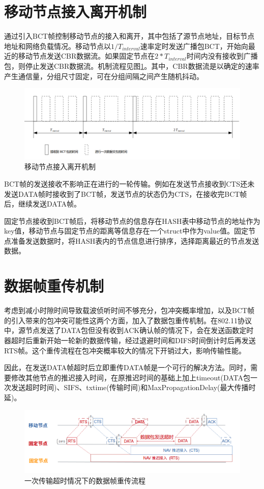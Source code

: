 \section {移动节点接入离开机制}
通过引入BCT帧控制移动节点的接入和离开，其中包括了源节点地址，目标节点地址和网络负载情况。移动节点以$1/T_{interval}$速率定时发送广播包BCT，开始向最近的移动节点发送CBR数据流。如果固定节点在$2*T_{interval}$时间内没有接收到广播包，则停止发送CBR数据流。机制流程见图\ref{fig6}。其中，CBR数据流是以确定的速率产生通信量，分组尺寸固定，可在分组间隔之间产生随机抖动。
\begin{figure}[!ht]
	\centering
	\includegraphics[scale=0.4]{figures/mj.png}
	\caption{
		移动节点接入离开机制
	}
	\label{fig6}
\end{figure}

BCT帧的发送接收不影响正在进行的一轮传输。例如在发送节点接收到CTS还未发送DATA帧时接收到了BCT帧，发送节点的状态仍为CTS，在接收完BCT帧后，继续发送DATA帧。

固定节点接收到BCT帧后，将移动节点的信息存在HASH表中移动节点的地址作为key值，移动节点与固定节点的距离等信息存在一个struct中作为value值。固定节点准备发送数据时，将HASH表内的节点信息进行排序，选择距离最近的节点发送数据。

\section {数据帧重传机制}
考虑到减小时隙时间导致载波侦听时间不够充分，包冲突概率增加，以及BCT帧的引入带来的包冲突可能性这两个方面，加入了数据包重传机制。在802.11协议中，源节点发送了DATA包但没有收到ACK确认帧的情况下，会在发送函数定时器超时后重新开始一轮新的数据传输，经过退避时间和DIFS时间倒计时后再发送RTS帧。这个重传流程在包冲突概率较大的情况下开销过大，影响传输性能。

因此，在发送DATA帧超时后立即重传DATA帧是一个可行的解决方法。同时，需要修改其他节点的推迟接入时间，在原推迟时间的基础上加上timeout(DATA包一次发送超时时间)、SIFS、txtime(传输时间)和MaxPropagationDelay(最大传播时延)。

\begin{figure}[!ht]
	\centering
	\includegraphics[scale=0.4]{figures/chongchuan.png}
	\caption{
	     一次传输超时情况下的数据帧重传流程
	}
	\label{fig:example}
\end{figure}

